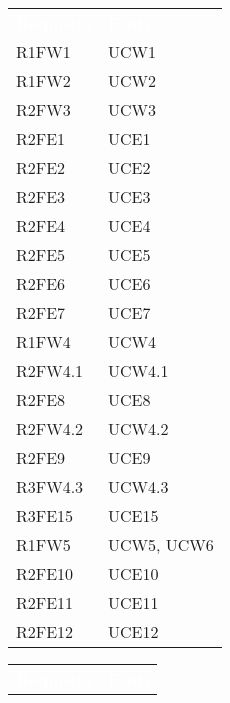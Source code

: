 \begin{table}[!htbp]
\renewcommand{\arraystretch}{1.5}
\begin{tabular}{ m{}<{\centering}  m{}<{\centering} }
	\rowcolor{darkblue}
	\textcolor{white}{\textbf{Requisito}} &\textcolor{white}{\textbf{Fonti}}\\ 

	R1FW1 & UCW1 \\	
	 
	R1FW2 & UCW2\\	

	R2FW3 & UCW3\\	
	 
	R2FE1 & UCE1\\	
	 
 	R2FE2 & UCE2\\	
	 
	R2FE3 & UCE3\\	

	R2FE4 & UCE4\\	
	
	R2FE5 & UCE5 \\
	 
	R2FE6 & UCE6 \\	 
	 
	R2FE7 & UCE7\\	

	R1FW4 & UCW4 \\ 
	 
	R2FW4.1 & UCW4.1\\	
	 
	R2FE8 & UCE8\\	
	 
	R2FW4.2 & UCW4.2\\		 

	R2FE9 & UCE9 \\		
	 
	R3FW4.3 & UCW4.3\\				
	 
	R3FE15 & UCE15\\			
	  	 	 	
	R1FW5 & UCW5, UCW6\\		
	 
	R2FE10 & UCE10\\
	
	R2FE11 & UCE11\\
	 
	R2FE12 & UCE12\\	

\end{tabular}
\begin{tabular}{ m{}<{\centering}  m{}<{\centering} }
	\rowcolor{darkblue}
	\textcolor{white}{\textbf{Requisito}} &\textcolor{white}{\textbf{Fonti}}\\ 
	 

\end{tabular}
\end{table}
